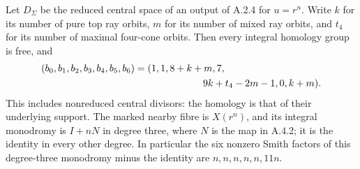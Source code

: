 \begin{theorem}\label{push:src:A.4.8}\label{push:A48}
Let $D_\Sigma$ be the reduced central space of an output of
A.2.4 for $u=r^n$. Write $k$ for its number of pure top
ray orbits, $m$ for its number of mixed ray orbits, and
$t_4$ for its number of maximal four-cone orbits. Then
every integral homology group is free, and
\[
 \begin{split}
 (b_0,b_1,b_2,b_3,b_4,b_5,b_6)
   ={}&(1,1,8+k+m,7,\\
       &\hspace{20mm}9k+t_4-2m-1,0,k+m).
 \end{split}
\]
This includes nonreduced central divisors: the homology
is that of their underlying support. The marked nearby
fibre is $X(r^n)$, and its integral monodromy is
$I+nN$ in degree three, where $N$ is the map in A.4.2;
it is the identity in every other degree. In particular
the six nonzero Smith factors of this degree-three
monodromy minus the identity are
$n,n,n,n,n,11n$.
\end{theorem}
